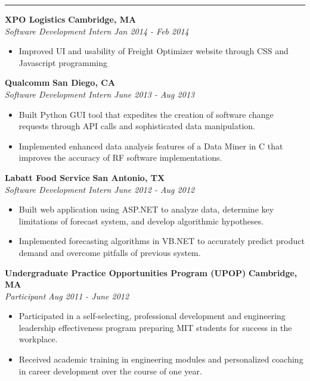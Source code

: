 \documentclass{res}
\begin{document}
\begin{resume}
\noindent\rule{\resumewidth}{0.4pt}   %

\vspace{-5pt}

 {\bf XPO Logistics} \hfill {\bf Cambridge, MA} \\
{\textit {Software Development Intern}} \hfill {\textit {Jan 2014 - Feb 2014}} 
 \begin{itemize}
\renewcommand{\labelitemi}{\ding{117}}
\itemsep -2pt  %

 \item Improved UI and usability of Freight Optimizer website through CSS and Javascript programming
 \end{itemize}

 {\bf Qualcomm} \hfill {\bf San Diego, CA} \\
{\textit {Software Development Intern}} \hfill {\textit {June 2013 - Aug 2013}} 
 \begin{itemize} 
\renewcommand{\labelitemi}{\ding{117}}
\itemsep -2pt  %
 \item Built Python GUI tool that expedites the creation of software 
	change requests through API calls and sophisticated data manipulation.
 \item Implemented enhanced data analysis features of a Data Miner in C that
	 improves the accuracy of RF software implementations.
 \end{itemize}

 {\bf Labatt Food Service} \hfill {\bf San Antonio, TX} \\
{\textit {Software Development Intern}} \hfill {\textit {June 2012 - Aug 2012}} 
\begin{itemize}
\renewcommand{\labelitemi}{\ding{117}}
\itemsep -2pt  %
 \item Built web application using ASP.NET to analyze data, determine key limitations of
	forecast system, and develop algorithmic hypotheses.
 \item Implemented forecasting algorithms in VB.NET to accurately predict product demand
	and overcome pitfalls of previous system.
 \end{itemize}

 {\bf Undergraduate Practice Opportunities Program (UPOP)} \hfill {\bf Cambridge, MA} \\
{\textit {Participant}} \hfill {\textit {Aug 2011 - June 2012}}
 \begin{itemize} 
\renewcommand{\labelitemi}{\ding{117}}
\itemsep -2pt  %
 \item	Participated in a self-selecting, professional development and engineering leadership effectiveness program preparing MIT students for success in the workplace.
 \item Received academic training in engineering modules and personalized coaching in career development over the course of one year. 
 \end{itemize}


\end{resume}
\end{document}
